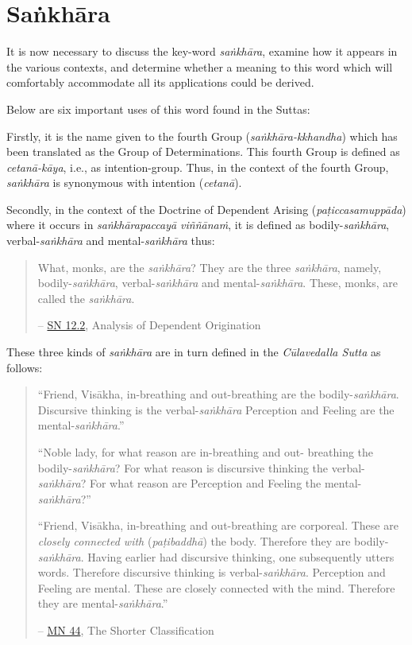 \chapter{Saṅkhāra}

It is now necessary to discuss the key-word \textit{saṅkhāra}, examine how it appears in the various contexts, and determine whether a meaning to this word which will comfortably accommodate all its applications could be derived.

Below are six important uses of this word found in the Suttas:

Firstly, it is the name given to the fourth Group (\textit{saṅkhāra-kkhandha}) which has been translated as the Group of Determinations. This fourth Group is defined as \textit{cetanā-kāya}, i.e., as intention-group. Thus, in the context of the fourth Group, \textit{saṅkhāra} is synonymous with intention (\textit{cetanā}).

Secondly, in the context of the Doctrine of Dependent Arising (\textit{paṭiccasamuppāda}) where it occurs in \textit{saṅkhārapaccayā viññānaṁ}, it is defined as bodily-\textit{saṅkhāra}, verbal-\textit{saṅkhāra} and mental-\textit{saṅkhāra} thus:

\begin{quote}
What, monks, are the \textit{saṅkhāra}? They are the three \textit{saṅkhāra}, namely, bodily-\textit{saṅkhāra}, verbal-\textit{saṅkhāra} and mental-\textit{saṅkhāra}. These, monks, are called the \textit{saṅkhāra}.

 -- \href{https://suttacentral.net/sn12.2/en/bodhi}{SN 12.2}, Analysis of Dependent Origination
\end{quote}

These three kinds of \textit{saṅkhāra} are in turn defined in the \textit{Cūlavedalla Sutta} as follows:

\begin{quote}
``Friend, Visākha, in-breathing and out-breathing are the bodily-\textit{saṅkhāra}. Discursive thinking is the verbal-\textit{saṅkhāra} Perception and Feeling are the mental-\textit{saṅkhāra}.''

``Noble lady, for what reason are in-breathing and out- breathing the bodily-\textit{saṅkhāra}? For what reason is discursive thinking the verbal-\textit{saṅkhāra}? For what reason are Perception and Feeling the mental-\textit{saṅkhāra}?''

``Friend, Visākha, in-breathing and out-breathing are corporeal. These are \emph{closely connected with} (\textit{paṭibaddhā}) the body. Therefore they are bodily-\textit{saṅkhāra}. Having earlier had discursive thinking, one subsequently utters words. Therefore discursive thinking is verbal-\textit{saṅkhāra}. Perception and Feeling are mental. These are closely connected with the mind. Therefore they are mental-\textit{saṅkhāra}.''

 -- \href{https://suttacentral.net/mn44/en/sujato}{MN 44}, The Shorter Classification
\end{quote}

